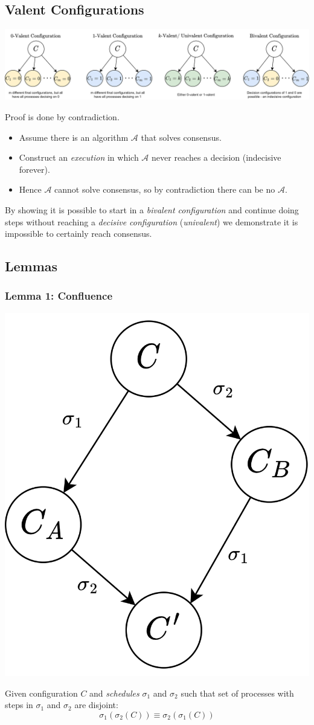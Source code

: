 \subsection{Valent Configurations}
\begin{center}
    \includegraphics[width=\textwidth]{consensus/images/valent_configurations.drawio.png}
\end{center}

Proof is done by contradiction.
\begin{itemize}
    \item Assume there is an algorithm $\mathcal{A}$ that solves consensus.
    \item Construct an \textit{execution} in which $\mathcal{A}$ never reaches a decision (indecisive forever).
    \item Hence $\mathcal{A}$ cannot solve consensus, so by contradiction there can be no $\mathcal{A}$.
\end{itemize}
By showing it is possible to start in a \textit{bivalent configuration} and continue doing steps without reaching a \textit{decisive configuration} (\textit{univalent}) we demonstrate it is impossible to certainly reach consensus.

\subsection{Lemmas}
\subsubsection{Lemma 1: Confluence}
\begin{center}
    \includegraphics[width=.2\textwidth]{consensus/images/lemma_confluence.drawio.png}
\end{center}
Given configuration $C$ and \textit{schedules} $\sigma_1$ and $\sigma_2$ such that set of processes with steps in $\sigma_1$ and $\sigma_2$ are disjoint:
\[\sigma_1(\sigma_2(C)) \equiv \sigma_2(\sigma_1(C))\]

